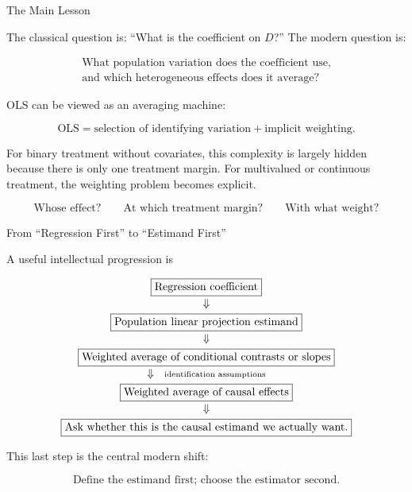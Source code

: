 \documentclass[aspectratio=169,11pt]{beamer}
\begin{document}
\begin{frame}{The Main Lesson}
\small

The classical question is:
``What is the coefficient on \(D\)?''
The modern question is:

\[
\boxed{
\begin{array}{c}
\text{What population variation does the coefficient use,}\\
\text{and which heterogeneous effects does it average?}
\end{array}
}
\]

\medskip

OLS can be viewed as an \alert{averaging machine}:

\[
\boxed{
\text{OLS}
=
\text{selection of identifying variation}
+
\text{implicit weighting}.
}
\]

For binary treatment without covariates, this complexity is largely
hidden because there is only one treatment margin.
For multivalued or continuous treatment, the weighting problem
becomes explicit.

\bigskip

\[
\boxed{
\text{Whose effect?}
\qquad
\text{At which treatment margin?}
\qquad
\text{With what weight?}
}
\]

\end{frame}


\begin{frame}{From ``Regression First'' to ``Estimand First''}
\small

A useful intellectual progression is

\[
\begin{array}{c}
\boxed{\text{Regression coefficient}}
\\[1mm]
\Downarrow
\\[1mm]
\boxed{\text{Population linear projection estimand}}
\\[1mm]
\Downarrow
\\[1mm]
\boxed{\text{Weighted average of conditional contrasts or slopes}}
\\[1mm]
\Downarrow\ \ \text{\scriptsize identification assumptions}
\\[1mm]
\boxed{\text{Weighted average of causal effects}}
\\[1mm]
\Downarrow
\\[1mm]
\boxed{\text{Ask whether this is the causal estimand we actually want.}}
\end{array}
\]

\medskip

This last step is the central modern shift:

\[
\boxed{
\text{Define the estimand first; choose the estimator second.}
}
\]

\end{frame}
\end{document}

